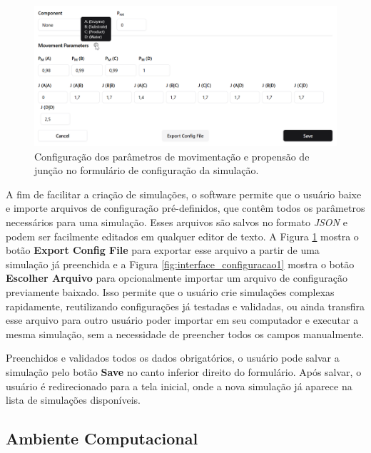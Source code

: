 \documentclass[12pt,oneside]{report}
\begin{document}
\begin{figure}[H]
    \centering
    \includegraphics[width=1\textwidth]{mov_config.png}
    \caption{\small Configuração dos parâmetros de movimentação e propensão de junção no formulário de configuração da simulação.}
    \label{fig:interface_movimentacao}
\end{figure}

A fim de facilitar a criação de simulações, o software permite que o usuário baixe e importe arquivos de configuração pré-definidos, que contêm todos os parâmetros necessários para uma simulação. Esses arquivos são salvos no formato \textit{JSON} e podem ser facilmente editados em qualquer editor de texto. A Figura \ref{fig:interface_movimentacao} mostra o botão \textbf{Export Config File} para exportar esse arquivo a partir de uma simulação já preenchida e a Figura \ref{fig:interface_configuracao1} mostra o botão \textbf{Escolher Arquivo} para opcionalmente importar um arquivo de configuração previamente baixado. Isso permite que o usuário crie simulações complexas rapidamente, reutilizando configurações já testadas e validadas, ou ainda transfira esse arquivo para outro usuário poder importar em seu computador e executar a mesma simulação, sem a necessidade de preencher todos os campos manualmente.

Preenchidos e validados todos os dados obrigatórios, o usuário pode salvar a simulação pelo botão \textbf{Save} no canto inferior direito do formulário. Após salvar, o usuário é redirecionado para a tela inicial, onde a nova simulação já aparece na lista de simulações disponíveis.

\subsection{Ambiente Computacional}
\end{document}
